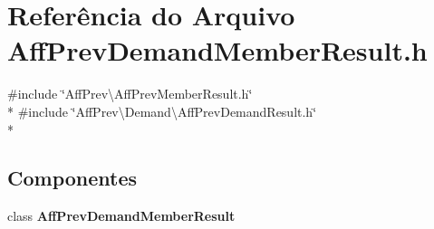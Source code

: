 \section{Referência do Arquivo Aff\+Prev\+Demand\+Member\+Result.\+h}
\label{_aff_prev_demand_member_result_8h}
{\ttfamily \#include \char`\"{}Aff\+Prev\textbackslash{}\+Aff\+Prev\+Member\+Result.\+h\char`\"{}}\\*
{\ttfamily \#include \char`\"{}Aff\+Prev\textbackslash{}\+Demand\textbackslash{}\+Aff\+Prev\+Demand\+Result.\+h\char`\"{}}\\*
\subsection*{Componentes}
\begin{DoxyCompactItemize}
\item 
class {\bf Aff\+Prev\+Demand\+Member\+Result}
\end{DoxyCompactItemize}
